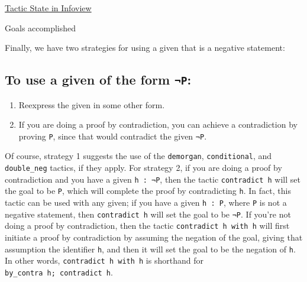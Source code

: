 \documentclass[
  letterpaper,
  DIV=11,
  numbers=noendperiod]{scrreprt}
\newenvironment{Shaded}{\begin{snugshade}}{\end{snugshade}}
\newcommand{\NormalTok}[1]{\textcolor[rgb]{0.00,0.23,0.31}{#1}}
\newcommand{\SpecialCharTok}[1]{\textcolor[rgb]{0.37,0.37,0.37}{#1}}
\providecommand{\tightlist}{%
  \setlength{\itemsep}{0pt}\setlength{\parskip}{0pt}}\usepackage{longtable,booktabs,array}
\renewcommand{\NormalTok}[1]{\textcolor[HTML]{000000}{#1}}
\renewcommand{\SpecialCharTok}[1]{}
\newcommand{\nobreakShaded}{\renewenvironment{Shaded}
	{\begin{tcolorbox}[frame hidden, enhanced, interior hidden, boxrule=0pt,
		borderline west={3pt}{0pt}{shadecolor}, sharp corners]}
	{\end{tcolorbox}}}
\newenvironment{outpt}
	{\nobreakShaded\begin{minipage}[t]{0.32\textwidth}}
	{\end{minipage}}
\begin{document}
\begin{outpt}

\uline{Tactic State in Infoview}

\begin{Shaded}
\begin{Highlighting}[]
\SpecialCharTok{!!}\NormalTok{Goals accomplished 🎉}
\end{Highlighting}
\end{Shaded}

\end{outpt}

Finally, we have two strategies for using a given that is a negative
statement:

\hypertarget{to-use-a-given-of-the-form-p}{%
\subsection*{\texorpdfstring{To use a given of the form
\texttt{¬P}:}{To use a given of the form ¬P:}}\label{to-use-a-given-of-the-form-p}}

\begin{enumerate}
\def\labelenumi{\arabic{enumi}.}
\tightlist
\item
  Reexpress the given in some other form.
\item
  If you are doing a proof by contradiction, you can achieve a
  contradiction by proving \texttt{P}, since that would contradict the
  given \texttt{¬P}.
\end{enumerate}

Of course, strategy 1 suggests the use of the \texttt{demorgan},
\texttt{conditional}, and \texttt{double\_neg} tactics, if they apply.
For strategy 2, if you are doing a proof by contradiction and you have a
given \texttt{h\ :\ ¬P}, then the tactic \texttt{contradict\ h} will set
the goal to be \texttt{P}, which will complete the proof by
contradicting \texttt{h}. In fact, this tactic can be used with any
given; if you have a given \texttt{h\ :\ P}, where \texttt{P} is not a
negative statement, then \texttt{contradict\ h} will set the goal to be
\texttt{¬P}. If you're not doing a proof by contradiction, then the
tactic \texttt{contradict\ h\ with\ h\textquotesingle{}} will first
initiate a proof by contradiction by assuming the negation of the goal,
giving that assumption the identifier \texttt{h\textquotesingle{}}, and
then it will set the goal to be the negation of \texttt{h}. In other
words, \texttt{contradict\ h\ with\ h\textquotesingle{}} is shorthand
for \texttt{by\_contra\ h\textquotesingle{};\ contradict\ h}.
\end{document}
